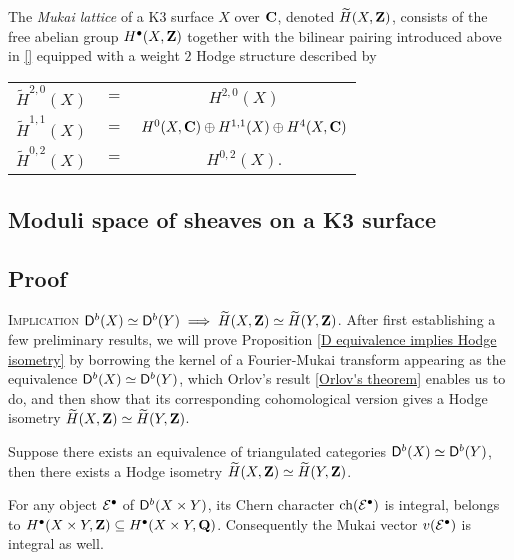 \begin{definition}
    The \emph{Mukai lattice} of a K3 surface $X$ over $\mathbf C$, denoted $\widetilde{H}(X, \mathbf Z)$, consists of the free abelian group $H^{\bullet}(X, \mathbf Z)$ together with the bilinear pairing introduced above in \eqref{} equipped with a weight $2$ Hodge structure described by 
\end{definition}

\begin{center}
    \begin{tabular}{r c c}
        $\widetilde{H}^{2,0}(X)$ & $=$ & $H^{2,0}(X)$ \\
        $\widetilde{H}^{1,1}(X)$ & $=$ & $H^{0}(X, \mathbf C) \oplus H^{1,1}(X) \oplus H^{4}(X, \mathbf C)$ \\
        $\widetilde{H}^{0,2}(X)$ & $=$ & $H^{0,2}(X)$.
    \end{tabular}
\end{center}

\subsection{Moduli space of sheaves on a K3 surface}
\subsection{Proof}


\noindent
\textsc{Implication $\mathsf{D}^b(X) \simeq \mathsf{D}^b(Y) \implies \widetilde{H}(X, \mathbf Z) \simeq \widetilde{H}(Y, \mathbf Z)$.} After first establishing a few preliminary results, we will prove Proposition \ref{D equivalence implies Hodge isometry} by borrowing the kernel of a Fourier-Mukai transform appearing as the equivalence $\mathsf{D}^b(X) \simeq \mathsf{D}^b(Y)$, which Orlov's result \ref{Orlov's theorem} enables us to do, and then show that its corresponding cohomological version gives a Hodge isometry $\widetilde{H}(X, \mathbf Z) \simeq \widetilde{H}(Y, \mathbf Z)$.

\begin{proposition}
    \label{D equivalence implies Hodge isometry}
    Suppose there exists an equivalence of triangulated categories $\mathsf{D}^b(X) \simeq \mathsf{D}^b(Y)$, then there exists a Hodge isometry $\widetilde{H}(X, \mathbf Z) \simeq \widetilde{H}(Y, \mathbf Z)$.
\end{proposition}

\begin{lemma}
    \label{Mukai vector is integral}
    For any object $\mathcal E^\bullet$ of $\mathsf{D}^b(X \times Y)$, its Chern character $\ch{\E^\bullet}$ is integral, \ie belongs to $H^\bullet(X \times Y, \mathbf Z) \subseteq H^\bullet(X \times Y, \mathbf Q)$. Consequently the Mukai vector $v(\mathcal E^\bullet)$ is integral as well.
\end{lemma}

